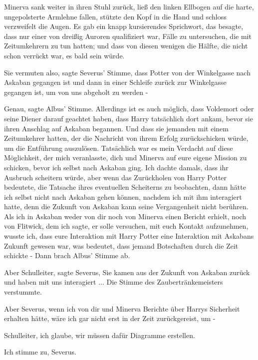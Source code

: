 Minerva sank weiter in ihren Stuhl zurück, ließ den linken Ellbogen auf die
harte, ungepolsterte Armlehne fallen, stützte den Kopf in die Hand und schloss
verzweifelt die Augen. Es gab ein knapp kursierendes Sprichwort, das besagte,
dass nur einer von dreißig Auroren qualifiziert war, Fälle zu untersuchen, die
mit Zeitumkehrern zu tun hatten; und dass von diesen wenigen die Hälfte, die
nicht schon verrückt war, es bald sein würde.

\glqq Sie vermuten also\grqq{}, sagte Severus' Stimme, \glqq dass Potter von der
Winkelgasse nach Askaban gegangen ist und dann in einer Schleife zurück zur
Winkelgasse gegangen ist, um von uns abgeholt zu werden -\grqq{}

\glqq Genau\grqq{}, sagte Albus' Stimme. \glqq Allerdings ist es auch möglich,
dass Voldemort oder seine Diener darauf geachtet haben, dass Harry tatsächlich
dort ankam, bevor sie ihren Anschlag auf Askaban begannen. Und dass sie jemanden
mit einem Zeitumkehrer hatten, der die Nachricht von ihrem Erfolg zurückschicken
würde, um die Entführung auszulösen. Tatsächlich war es mein Verdacht auf diese
Möglichkeit, der mich veranlasste, dich und Minerva auf eure eigene Mission zu
schicken, bevor ich selbst nach Askaban ging. Ich dachte damals, dass ihr
Ausbruch scheitern würde, aber wenn das Zurückholen von Harry Potter bedeutete,
die Tatsache ihres eventuellen Scheiterns zu beobachten, dann hätte ich selbst
nicht nach Askaban gehen können, nachdem ich mit ihm interagiert hatte, denn die
Zukunft von Askaban kann seine Vergangenheit nicht berühren. Als ich in Askaban
weder von dir noch von Minerva einen Bericht erhielt, noch von Flitwick, dem ich
sagte, er solle versuchen, mit euch Kontakt aufzunehmen, wusste ich, dass eure
Interaktion mit Harry Potter eine Interaktion mit Askabans Zukunft gewesen war,
was bedeutet, dass jemand Botschaften durch die Zeit schickte -\grqq{} Dann
brach Albus' Stimme ab.

\glqq Aber Schulleiter\grqq{}, sagte Severus, \glqq Sie kamen aus der Zukunft
von Askaban zurück und haben mit uns interagiert ...\grqq{} Die Stimme des
Zaubertränkemeisters verstummte.

\glqq Aber Severus, wenn ich von dir und Minerva Berichte über Harrys Sicherheit
erhalten hätte, wäre ich gar nicht erst in der Zeit zurückgereist, um -\grqq{}

\glqq Schulleiter, ich glaube, wir müssen dafür Diagramme erstellen.\grqq{}

\glqq Ich stimme zu, Severus.\grqq{}


